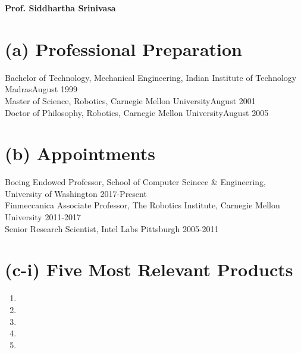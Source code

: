 \documentclass[10pt]{article}
\newcommand{\svn}[1]{\svnsub#1}
\def\svnsub$#1${#1}
\begin{document}
\pagestyle{empty} %

\par{\centering
		{\bf\LARGE Prof. Siddhartha Srinivasa
	}\bigskip\par}





\section{(a) Professional Preparation}
\noindent
Bachelor of Technology, Mechanical Engineering, Indian Institute of Technology Madras\hfill August 1999\\
Master of Science, Robotics, Carnegie Mellon University\hfill August 2001\\
Doctor of Philosophy, Robotics, Carnegie Mellon University\hfill August 2005\\

\section{(b) Appointments}
\noindent
Boeing Endowed Professor, School of Computer Scinece \& Engineering, University of Washington \hfill 2017-Present\\
Finmeccanica Associate Professor, The Robotics Institute, Carnegie Mellon University \hfill 2011-2017\\
Senior Research Scientist, Intel Labs Pittsburgh \hfill 2005-2011\\

\section{(c-i) Five Most Relevant Products}
\renewcommand{\labelenumi}{[ \arabic{enumi} ]\hfill}
\begin{enumerate}

\item {}

\item {}

\item {}

\item {}

\item {}


\end{enumerate}
\end{document}
